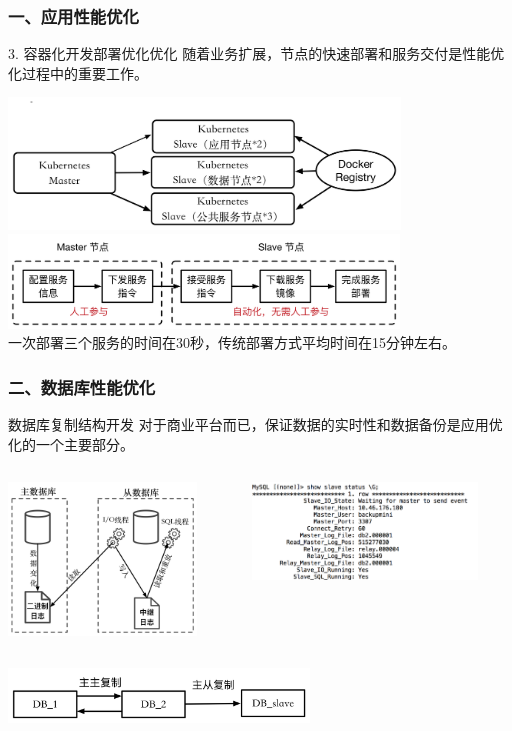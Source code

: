\documentclass{beamer}
\begin{document}
\begin{frame}
  \frametitle{一、应用性能优化}
    \begin{block}{3. 容器化开发部署优化优化}
      \footnotesize 随着业务扩展，节点的快速部署和服务交付是性能优化过程中的重要工作。
    \end{block}
    \centering
    \includegraphics[height=3.5cm]{./img/k8scluster.png} \\
    \centering
    \includegraphics[height=2.5cm]{./img/k8sdeploy.png}\\
    \footnotesize 一次部署三个服务的时间在30秒，传统部署方式平均时间在15分钟左右。
\end{frame}

\begin{frame}
\frametitle{二、数据库性能优化}
  \begin{block}{数据库复制结构开发}
    对于商业平台而已，保证数据的实时性和数据备份是应用优化的一个主要部分。
  \end{block}
  \begin{columns}
    \begin{column}{0.50\textwidth}
      \centering
      \includegraphics[width=5cm]{./img/03/sql.png}
      \label{fig:docker}
    \end{column}
    \begin{column}{0.50\textwidth}
      \centering
      \includegraphics[width=6cm]{./img/mysqlstatus.png}
    \end{column}
  \end{columns}
  \centering
  \includegraphics[width=8cm]{./img/mysqlcluster.png}
\end{frame}
\end{document}
